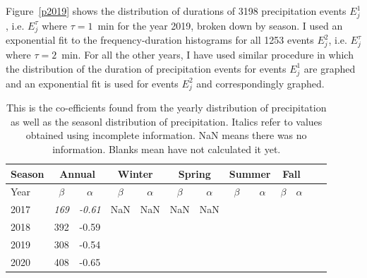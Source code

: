 \documentclass[11pt]{report}
\begin{document}
Figure~\ref{p2019} shows the distribution of durations of 3198
precipitation events $E_j^1$, i.e. $E_j^\tau$ where $\tau=1$~min for
the year 2019, broken down by season. I used an exponential fit to
the frequency-duration histograms for all 1253 events $E_j^2$,
i.e. $E_j^\tau$ where $\tau=2$~min. For all the other years, I have 
used similar procedure in which the distribution of the duration of 
precipitation events for events $E_j^1$ are graphed and an exponential 
fit is used for events $E_j^2$ and correspondingly graphed. 

\begin{table}[b]
	\begin{center}
		\begin{tabular}{|l|*{11}{c|}r|}
			\hline
			Season    &       \multicolumn{2}{|c|}{Annual}          & \multicolumn{2}{|c|}{Winter}& \multicolumn{2}{|c|}{Spring}  & \multicolumn{2}{|c|}{Summer} &\multicolumn{2}{|c|}{Fall}  \\
			\hline
			Year      & $\beta $ & $\alpha$  & $\beta $ & $\alpha$ & $\beta $ & $\alpha$ & $\beta $ & $\alpha$ & $\beta $ & $\alpha$\\
			\hline
			2017      & \textit{169}  & \textit{-0.61}  & NaN & NaN & NaN & NaN &  &  &  &   \\
			2018      & 392           & -0.59  &  & &  & &  &  &  &   \\
			2019      & 308           & -0.54  &  & &  & &  &  &  & \\
			2020      & 408           & -0.65   &   & &  & &  &  &  &\\
			\hline
		\end{tabular}
	\end{center}
	\caption[Year comparison of coefficients]{This is the co-efficients found from the yearly distribution of precipitation as well as the seasonl distribution of precipitation. Italics refer to values obtained using incomplete information. NaN means there was no information. Blanks mean have not calculated it yet.}
\end{table}
 
\end{document}
